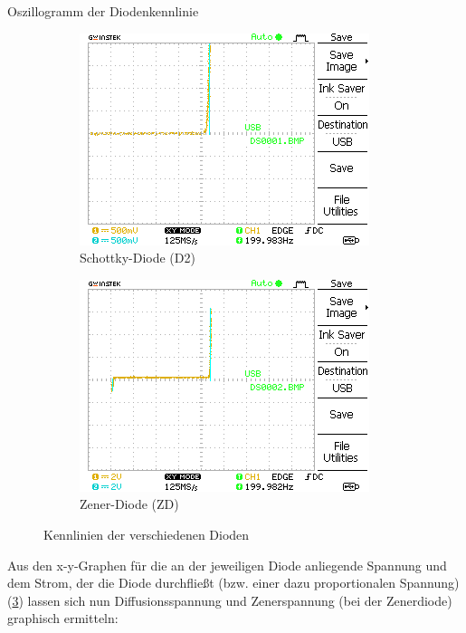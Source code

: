 \documentclass{article}
\theoremstyle{definition}
\begin{document}
\begin{aufgabe}{Oszillogramm der Diodenkennlinie}
\begin{figure}[H]
\begin{subfigure}[b]{0.45 \textwidth}
            \includegraphics[width=\textwidth]{MesswerteVersuch2/m2_1.png}
            \caption{Schottky-Diode (D2)}
            \label{a2_1}
        \end{subfigure}
        \hfill
        \begin{subfigure}[b]{0.45 \textwidth}
            \includegraphics[width=\textwidth]{MesswerteVersuch2/m2_2.png}
            \caption{Zener-Diode (ZD)}
            \label{a2_2}
        \end{subfigure}
        \caption{Kennlinien der verschiedenen Dioden}
        \label{a2}
    \end{figure}
    \auswertung
    Aus den x-y-Graphen für die an der jeweiligen Diode anliegende Spannung und dem Strom, der die Diode durchfließt (bzw. einer dazu proportionalen Spannung)(\ref{a2}) lassen sich nun Diffusionsspannung und Zenerspannung (bei der Zenerdiode) graphisch ermitteln:

\end{aufgabe}
\end{document}
